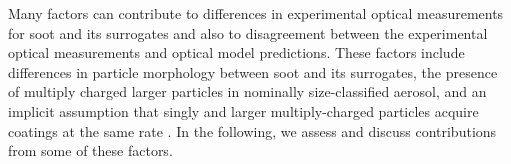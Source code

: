 \documentclass[12pt,authoryear]{elsarticle}
\providecommand{\DIFdelbeginFL}{} %
\begin{document}
Many factors can contribute to differences in experimental optical measurements for soot and its surrogates and also to disagreement between the experimental optical measurements and optical model predictions. These factors include differences in particle morphology between soot and its surrogates, the presence of multiply charged larger particles in nominally size-classified aerosol, and an implicit assumption that singly and larger multiply-charged particles acquire coatings at the same rate \citep{RN75}. In the following, we assess and discuss contributions from some of these factors.

\begin{figure}[htp]
    \centering
    \DIFdelbeginFL %

\end{figure}
\end{document}
